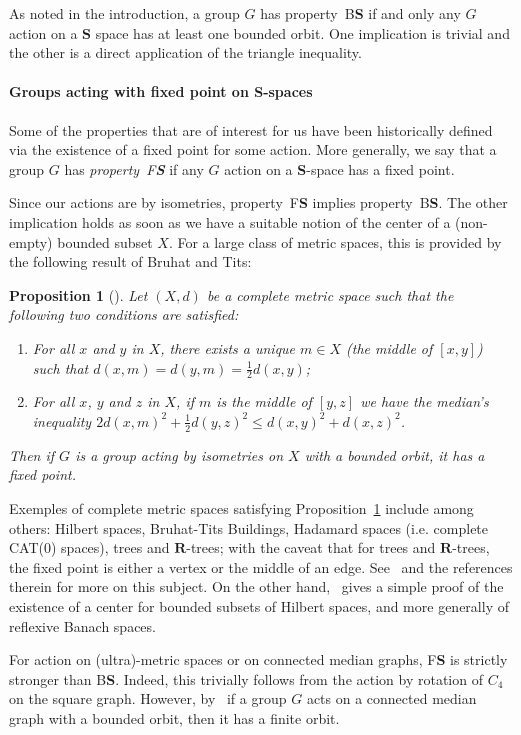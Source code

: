 \documentclass[a4paper]{article}
\newcommand{\PH}[1]{\todo[color={blue!33},size=small]{\textbf{PH :} #1}}
\newtheorem{prop}[lem]{Proposition}
\theoremstyle{definition}
\newcommand*{\field}[1]{\mathbf{#1}}
\newcommand*{\category}[1]{\textbf{#1}}
\newcommand*{\CatS}{\category{S}}
\newcommand*{\R}{\field{R}}
\newcommand*{\BS}{B\textbf{S}}
\newcommand*{\FS}{F\textbf{S}}
\begin{document}
As noted in the introduction, a group $G$ has property~\BS{} if and only any $G$ action on a $\category S$ space has at least one bounded orbit.
One implication is trivial and the other is a direct application of the triangle inequality.\PH{Rajouté ce~§. On garde ?}
%
%
%
%
%
\paragraph{Groups acting with fixed point on \CatS-spaces}
Some of the properties that are of interest for us have been historically defined via the existence of a fixed point for some action.
More generally, we say that a group $G$ has \emph{property~\FS} if any $G$ action on a \CatS-space has a fixed point.

Since our actions are by isometries, property~\FS{} implies property~\BS. The other implication holds as soon as we have a suitable notion of the center of a (non-empty) bounded subset $X$.
For a large class of metric spaces, this is provided by the following result of Bruhat and Tits:
%
%
\begin{prop}[{\cite[Chapter 3.b]{MR1023471}}]\label{Proposition:Mediane}
Let $(X,d)$ be a complete metric space such that the following two conditions are satisfied:
\begin{enumerate}
\item For all $x$ and $y$ in $X$, there exists a unique $m\in X$ (the middle of $[x,y]$) such that $d(x,m)=d(y,m)=\frac12d(x,y)$;
\item For all $x$, $y$ and $z$ in $X$, if $m$ is the middle of $[y,z]$ we have the median's inequality  $2d(x,m)^2+\frac12d(y,z)^2\leq d(x,y)^2+d(x,z)^2$.
\end{enumerate}
Then if $G$ is a group acting by isometries on $X$ with a bounded orbit, it has a fixed point.
\end{prop}
%
%
Exemples of complete metric spaces satisfying Proposition~\ref{Proposition:Mediane} include among others: Hilbert spaces, Bruhat-Tits Buildings, Hadamard spaces (i.e. complete CAT(0) spaces), trees and $\R$-trees; with the caveat that for trees and $\R$-trees, the fixed point is either a vertex or the middle of an edge.
See~\cite[Chapter 3.b]{MR1023471} and the references therein for more on this subject.
On the other hand,~\cite[Lemma 2.2.7]{Bekka2008} gives a simple proof of the existence of a center for bounded subsets of Hilbert spaces, and more generally of reflexive Banach spaces.

For action on (ultra)-metric spaces or on connected median graphs, \FS{} is strictly stronger than \BS.
Indeed, this trivially follows from the action by rotation of $C_4$ on the square graph.
However,  by~\cite{Cornulier2013,MR1663779} if a group $G$ acts on a connected median graph with a bounded orbit, then it has a finite orbit.
%
%
%
%
%
\end{document}
